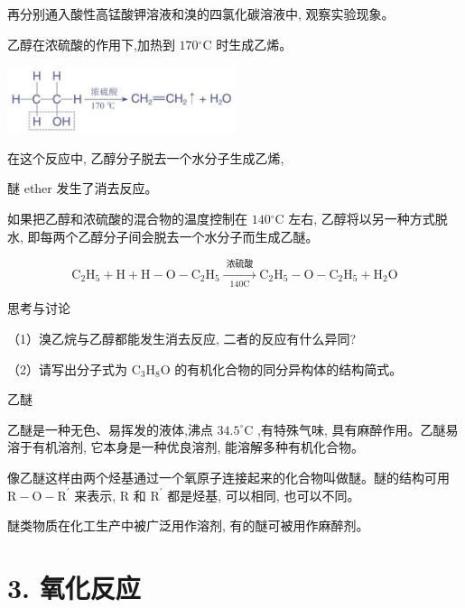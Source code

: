 \documentclass[10pt]{article}
\begin{document}
再分别通入酸性高锰酸钾溶液和溴的四氯化碳溶液中, 观察实验现象。

乙醇在浓硫酸的作用下,加热到 \({170}{}^{ \circ }\mathrm{C}\) 时生成乙烯。

\begin{center}
\includegraphics[max width=0.5\textwidth]{images/0190efc5-b58a-7c43-bfb0-e0a030df9cfd_67_421957.jpg}
\end{center}

在这个反应中, 乙醇分子脱去一个水分子生成乙烯,

醚 ether 发生了消去反应。

如果把乙醇和浓硫酸的混合物的温度控制在 \({140}{}^{ \circ }\mathrm{C}\) 左右, 乙醇将以另一种方式脱水, 即每两个乙醇分子间会脱去一个水分子而生成乙醚。

\[
{\mathrm{C}}_{2}{\mathrm{H}}_{5} + \mathrm{H} + \mathrm{H} - \mathrm{O} - {\mathrm{C}}_{2}{\mathrm{H}}_{5}\xrightarrow[{{140}\mathrm{C}}]{\text{ 浓硫酸 }}{\mathrm{C}}_{2}{\mathrm{H}}_{5} - \mathrm{O} - {\mathrm{C}}_{2}{\mathrm{H}}_{5} + {\mathrm{H}}_{2}\mathrm{O}
\]

\begin{mdframed}

思考与讨论

（1）溴乙烷与乙醇都能发生消去反应, 二者的反应有什么异同?

（2）请写出分子式为 \({\mathrm{C}}_{3}{\mathrm{H}}_{8}\mathrm{O}\) 的有机化合物的同分异构体的结构简式。

\end{mdframed}

乙醚

乙醚是一种无色、易挥发的液体,沸点 \({34.5}^{ \circ }\mathrm{C}\) ,有特殊气味, 具有麻醉作用。乙醚易溶于有机溶剂, 它本身是一种优良溶剂, 能溶解多种有机化合物。

像乙醚这样由两个烃基通过一个氧原子连接起来的化合物叫做醚。醚的结构可用 \(\mathrm{R} - \mathrm{O} - {\mathrm{R}}^{\prime }\) 来表示, \(\mathrm{R}\) 和 \({\mathrm{R}}^{\prime }\) 都是烃基, 可以相同, 也可以不同。

醚类物质在化工生产中被广泛用作溶剂, 有的醚可被用作麻醉剂。

\section*{3. 氧化反应}
\end{document}
